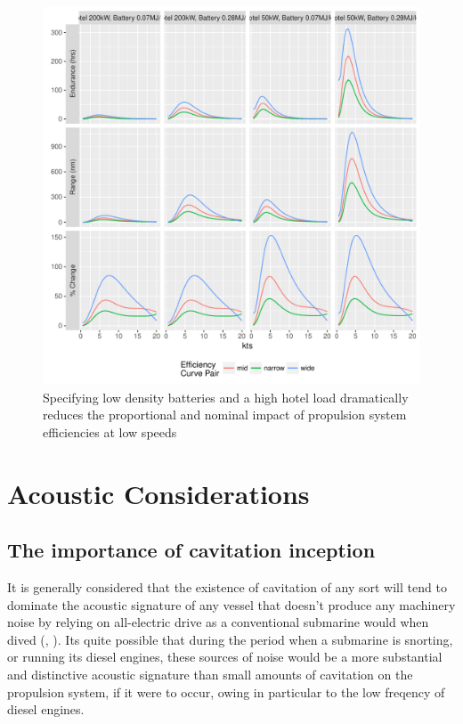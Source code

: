 \documentclass{article}\usepackage[]{graphicx}\usepackage[]{color}
\makeatletter
\def\maxwidth{ %
  \ifdim\Gin@nat@width>\linewidth
    \linewidth
  \else
    \Gin@nat@width
  \fi
}
\newenvironment{knitrout}{}{} %
\makeatother
\begin{document}
\begin{figure}
\begin{knitrout}
\color{fgcolor}

{\centering \includegraphics[width=\maxwidth]{figures/plots-plot_sens_corners-1} 

}



\end{knitrout}
\caption{Specifying low density batteries and a high hotel load dramatically reduces the proportional and nominal impact of propulsion system efficiencies at low speeds}
\label{fig:sens_corners}
\end{figure}

\section{Acoustic Considerations}

\subsection{The importance of cavitation inception}
It is generally considered that the existence of cavitation of any sort will tend to dominate the acoustic signature of any vessel that doesn't produce any machinery noise by relying on all-electric drive as a conventional submarine would when dived (\cite{giles2010}, \cite{harvie1965construction}).  Its quite possible that during the period when a submarine is snorting, or running its diesel engines, these sources of noise would be a more substantial and distinctive acoustic signature than small amounts of cavitation on the propulsion system, if it were to occur, owing in particular to the low freqency of diesel engines.
\end{document}

